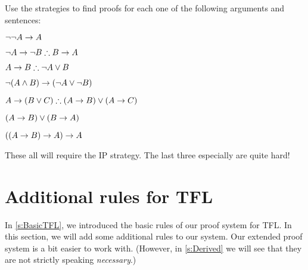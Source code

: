 \problempart
Use the strategies to find proofs for each one of the following arguments and sentences:
\begin{compactlist}
\item $\neg\neg A \rightarrow A$
\item $\enot A \eif \enot B \therefore B \eif A$
\item $A \eif B \therefore \enot A \eor B$
\item $\neg(A \wedge B) \rightarrow (\neg A \vee \neg B)$
\item $A \eif (B \eor C) \therefore (A \eif B) \eor (A \eif C)$
\item $(A \rightarrow B) \lor (B \rightarrow A)$
\item $((A \rightarrow B) \rightarrow A) \rightarrow A$
\end{compactlist}
These all will require the IP strategy. The last three especially are quite hard!

\chapter{Additional rules for TFL}\label{s:Further}
In \cref{s:BasicTFL}, we introduced the basic rules of our proof system for TFL. In this section, we will add some additional rules to our system. Our extended proof system is a bit easier to work with. (However, in \cref{s:Derived} we will see that they are not strictly speaking \emph{necessary}.)


